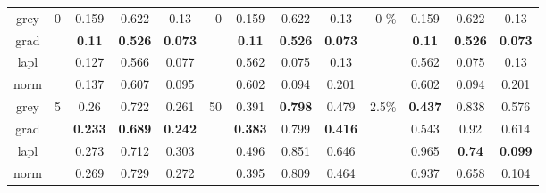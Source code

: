 \begin{table}[htbp]
\begin{tabular}{crrrrrrrrrrrr}
    grey  & \multicolumn{1}{r}{\multirow{4}[1]{*}{0}} & \multicolumn{1}{c}{0.159} & \multicolumn{1}{c}{0.622} & \multicolumn{1}{c}{0.13} & \multicolumn{1}{r}{\multirow{4}[1]{*}{0}} & \multicolumn{1}{c}{0.159} & \multicolumn{1}{c}{0.622} & \multicolumn{1}{c}{0.13} & \multicolumn{1}{r}{\multirow{4}[1]{*}{0 \%}} & \multicolumn{1}{c}{0.159} & \multicolumn{1}{c}{0.622} & \multicolumn{1}{c}{0.13} \\
    grad  &       & \multicolumn{1}{c}{\textbf{0.11}} & \multicolumn{1}{c}{\textbf{0.526}} & \multicolumn{1}{c}{\textbf{0.073}} &       & \multicolumn{1}{c}{\textbf{0.11}} & \multicolumn{1}{c}{\textbf{0.526}} & \multicolumn{1}{c}{\textbf{0.073}} &       & \multicolumn{1}{c}{\textbf{0.11}} & \multicolumn{1}{c}{\textbf{0.526}} & \multicolumn{1}{c}{\textbf{0.073}} \\
    lapl  &       & \multicolumn{1}{c}{0.127} & \multicolumn{1}{c}{0.566} & \multicolumn{1}{c}{0.077} &       & \multicolumn{1}{c}{0.562} & \multicolumn{1}{c}{0.075} & \multicolumn{1}{c}{0.13} &       & \multicolumn{1}{c}{0.562} & \multicolumn{1}{c}{0.075} & \multicolumn{1}{c}{0.13} \\
    norm  &       & \multicolumn{1}{c}{0.137} & \multicolumn{1}{c}{0.607} & \multicolumn{1}{c}{0.095} &       & \multicolumn{1}{c}{0.602} & \multicolumn{1}{c}{0.094} & \multicolumn{1}{c}{0.201} &       & \multicolumn{1}{c}{0.602} & \multicolumn{1}{c}{0.094} & \multicolumn{1}{c}{0.201} \\
    
    \midrule
    
    grey  & \multicolumn{1}{r}{\multirow{4}[2]{*}{5}} & \multicolumn{1}{c}{0.26} & \multicolumn{1}{c}{0.722} & \multicolumn{1}{c}{0.261} & \multicolumn{1}{r}{\multirow{4}[2]{*}{50}} & \multicolumn{1}{c}{0.391} & \multicolumn{1}{c}{\textbf{0.798}} & \multicolumn{1}{c}{0.479} & \multicolumn{1}{r}{\multirow{4}[2]{*}{2.5\%}} & \multicolumn{1}{c}{\textbf{0.437}} & \multicolumn{1}{c}{0.838} & \multicolumn{1}{c}{0.576} \\
    grad  &       & \multicolumn{1}{c}{\textbf{0.233}} & \multicolumn{1}{c}{\textbf{0.689}} & \multicolumn{1}{c}{\textbf{0.242}} &       & \multicolumn{1}{c}{\textbf{0.383}} & \multicolumn{1}{c}{0.799} & \multicolumn{1}{c}{\textbf{0.416}} &       & \multicolumn{1}{c}{0.543} & \multicolumn{1}{c}{0.92} & \multicolumn{1}{c}{0.614} \\
    lapl  &       & \multicolumn{1}{c}{0.273} & \multicolumn{1}{c}{0.712} & \multicolumn{1}{c}{0.303} &       & \multicolumn{1}{c}{0.496} & \multicolumn{1}{c}{0.851} & \multicolumn{1}{c}{0.646} &       & \multicolumn{1}{c}{0.965} & \multicolumn{1}{c}{\textbf{0.74}} & \multicolumn{1}{c}{\textbf{0.099}} \\
    norm  &       & \multicolumn{1}{c}{0.269} & \multicolumn{1}{c}{0.729} & \multicolumn{1}{c}{0.272} &       & \multicolumn{1}{c}{0.395} & \multicolumn{1}{c}{0.809} & \multicolumn{1}{c}{0.464} &       & \multicolumn{1}{c}{0.937} & \multicolumn{1}{c}{0.658} & \multicolumn{1}{c}{0.104} \\
    

\end{tabular}
\end{table}
